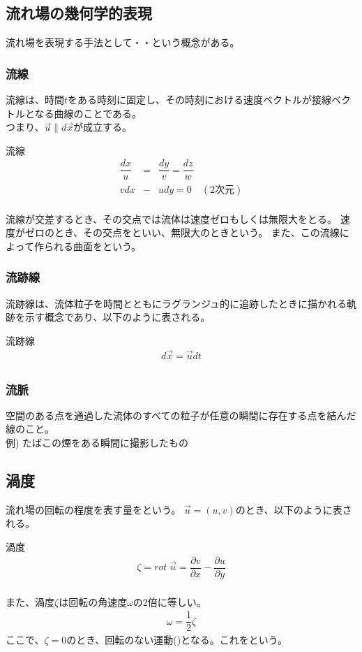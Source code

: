 \documentclass[a4paper]{jsarticle}
\begin{document}
\subsection{流れ場の幾何学的表現}
流れ場を表現する手法として・・という概念がある。\\
\subsubsection{流線}
流線は、時間$t$をある時刻に固定し、その時刻における速度ベクトルが接線ベクトルとなる曲線のことである。\\
つまり、$\vec{u}\parallel d\vec{x}$が成立する。
\begin{itembox}[l]{流線}
    \begin{eqnarray*}
        \dfrac{dx}{u}&=&\dfrac{dy}{v}=\dfrac{dz}{w}\\
        vdx&-&udy=0\quad (2次元)\\
    \end{eqnarray*}
\end{itembox}
流線が交差するとき、その交点では流体は速度ゼロもしくは無限大をとる。
速度がゼロのとき、その交点をといい、無限大のときという。
また、この流線によって作られる曲面をという。
\subsubsection{流跡線}
流跡線は、流体粒子を時間とともにラグランジュ的に追跡したときに描かれる軌跡を示す概念であり、以下のように表される。
\begin{itembox}[l]{流跡線}
    \begin{eqnarray*}
        d\vec{x}=\vec{u}dt\\
    \end{eqnarray*}
\end{itembox}
\subsubsection{流脈}
空間のある点を通過した流体のすべての粒子が任意の瞬間に存在する点を結んだ線のこと。\\
例) たばこの煙をある瞬間に撮影したもの
\subsection{渦度}
流れ場の回転の程度を表す量をという。
$\vec{u}=\left(u,v\right)$のとき、以下のように表される。
\begin{itembox}[l]{渦度}
    \begin{eqnarray*}
        \zeta = rot\;\vec{u}=\dfrac{\partial v}{\partial x}-\dfrac{\partial u}{\partial y}\\
    \end{eqnarray*}
\end{itembox}
また、渦度$\zeta$は回転の角速度$\omega$の2倍に等しい。
\begin{eqnarray*}
    \omega = \dfrac{1}{2}\zeta
\end{eqnarray*}
ここで、$\zeta=0$のとき、回転のない運動()となる。これをという。
\end{document}
